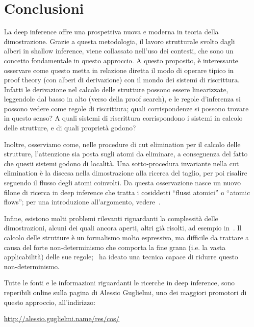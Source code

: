 \documentclass[12pt,a4paper,openright,twoside]{report}
\begin{document}
\chapter*{Conclusioni}

La deep inference offre una prospettiva nuova e moderna in teoria della dimostrazione. Grazie a questa metodologia, il lavoro strutturale svolto dagli alberi in shallow inference, viene collassato nell'uso dei contesti, che sono un concetto fondamentale in questo approccio. A questo proposito, \`e interessante osservare come questo metta in relazione diretta il modo di operare tipico in proof theory (con alberi di derivazione) con il mondo dei sistemi di riscrittura. Infatti le derivazione nel calcolo delle strutture possono essere linearizzate, leggendole dal basso in alto (verso della proof search), e le regole d'inferenza si possono vedere come regole di riscrittura; quali corrispondenze si possono trovare in questo senso? A quali sistemi di riscrittura corrispondono i sistemi in calcolo delle strutture, e di quali propriet\`a godono?

Inoltre, osserviamo come, nelle procedure di cut elimination per il calcolo delle strutture, l'attenzione sia posta sugli atomi da eliminare, a conseguenza del fatto che questi sistemi godono di localit\`a. Una sotto-procedura invariante nella cut elimination \`e la discesa nella dimostrazione alla ricerca del taglio, per poi risalire seguendo il flusso degli atomi coinvolti. Da questa osservazione nasce un nuovo filone di ricerca in deep inference che tratta i cosiddetti ``flussi atomici'' o ``atomic flows''; per una introduzione all'argomento, vedere~\cite{Gund09}.

Infine, esistono molti problemi rilevanti riguardanti la complessit\`a delle dimostrazioni, alcuni dei quali ancora aperti, altri gi\`a risolti, ad esempio in~\cite{Jer09, BruGug09, BruGugGunPar09}. Il calcolo delle strutture \`e un formalismo molto espressivo, ma difficile da trattare a causa del forte non-determinismo che comporta la fine grana (i.e. la vasta applicabilit\`a) delle sue regole; \cite{Kah06}~ha ideato una tecnica capace di ridurre questo non-determinismo.

Tutte le fonti e le informazioni riguardanti le ricerche in deep inference, sono reperibili online sulla pagina di Alessio Guglielmi, uno dei maggiori promotori di questo approccio, all'indirizzo:
\begin{center}
	\url{http://alessio.guglielmi.name/res/cos/}
\end{center}
\end{document}
